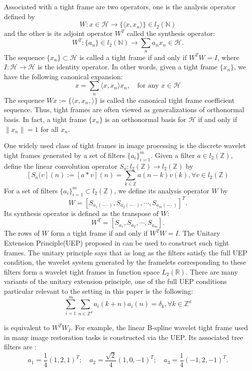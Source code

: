 \documentclass[a4paper]{article}
\begin{document}
{{Associated with a tight frame are two operators, one is the analysis operator defined by 
\[
	W: x\in \mathcal{H} \rightarrow \{\langle x,x_n\rangle\} \in l_2(\mathbb{N})
\]
and the other is its adjoint operator $W^T$ called the synthesis operator:
\[
	W^T : \{a_n\} \in l_2(\mathbb{N}) \rightarrow \sum_n a_n x_n\in \mathcal{H}.
\]
The sequence $\{x_n\}\subset\mathcal{H}$ is called a tight frame if and only if $W^TW=I$, where $I: \mathcal{H} \rightarrow \mathcal{H}$ is the identity operator. In other words, given a tight frame $\{x_n\}$, we have the following canonical expansion:
\[
	x=\sum_n \langle x,x_n\rangle x_n, \quad \textrm{for any } x\in \mathcal{H}
\]
The sequence $Wx:=\{\langle x,x_n,\rangle \}$ is called the canonical tight frame coefficient sequence. Thus, tight frames are often viewed as generalizations of orthonormal basis. In fact, a tight frame $\{x_n\}$ is an orthonormal basis for $\mathcal{H}$ if and only if $\|x_n\|=1$ for all $x_n$.

One widely used class of tight frames in image processing is the discrete wavelet tight frames generated by a set of filters $\{a_i\}_{i=1}^m$. Given a filter $a\in l_2(\mathbb{Z})$, define the linear convolution operator $S_a: l_2(\mathbb{Z}) \rightarrow l_2(\mathbb{Z})$ by 
\[
[S_a(v](n):=[a*v](n)=\sum_{k\in\mathbb{Z}}a(n-k)v(k), \forall v\in l_2(\mathbb{Z})
\]
For a set of filters $\{a_i\}_{i=1}^m\subset l_2(\mathbb{Z})$, we define its analysis operator $W$ by 
\[
	W=[S_{a_1(-\cdot)},S_{a_2(-\cdot)},\cdots,S_{a_m(-\cdot)}]^T.
\]
Its synthesis operator is defined as the transpose of $W$:
\[
	W^T=[S_{a_1},S_{a_2},\cdots, S_{a_m}].
\]
The rows of $W$ form a tight frame if and only if $W^TW=I$. The Unitary Extension Principle(UEP) proposed in  can be used to construct such tight frames. The unitary principle says that as long as the filters satisfy the full UEP condition, the wavelet system generated by the framelets corresponding to these filters form a wavelet tight frames in function space $L_2(\mathbb{R})$. There are many variants of the unitary extension principle, one of the full UEP conditions particular relevant to the setting in this paper is the following:
\begin{equation}
\label{eq:uep}
	\sum_{i=1}^m \sum_{n\in \mathbb{Z}^d} a_i(k+n) a_i(n)=\delta_k, \forall k\in \mathbb{Z^d}	
\end{equation}


is equivalent to $W^TW_I$. For example,  the linear B-spline wavelet tight frame used in many image restoration tasks is constructed via the UEP. Its associated tree filters are :
\[
	a_1=\frac{1}{4}(1,2,1)^T; \quad a_2=\frac{\sqrt{2}}{4}(1,0,-1)^T; \quad a_3=\frac{1}{4}(-1,2,-1)^T.
\]

}}
\end{document}
